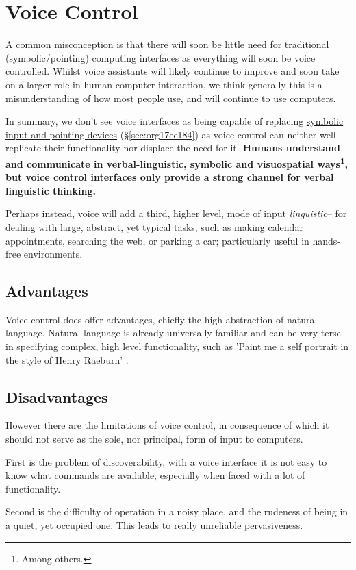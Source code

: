 \documentclass[logo,bsc,singlespacing,parskip]{infthesis}
\begin{document}
\section{Voice Control}
\label{sec:org6fb2dab}
A common misconception is that there will soon be little need for traditional (symbolic/pointing) computing interfaces as everything will soon be voice controlled.
Whilst voice assistants will likely continue to improve and soon take on a larger role in human-computer interaction, we think generally this is a misunderstanding of how most people use, and will continue to use computers.

In summary, we don't see voice interfaces as being capable of replacing \hyperref[sec:org17ee184]{symbolic input and pointing devices} (\S \ref{sec:org17ee184}) as voice control can neither well replicate their functionality nor displace the need for it.
\textbf{Humans understand and communicate in verbal-linguistic, symbolic and visuospatial ways\footnote{Among others.}, but voice control interfaces only provide a strong channel for verbal linguistic thinking.}

Perhaps instead, voice will add a third, higher level, mode of input \emph{linguistic}-- for dealing with large, abstract, yet typical tasks, such as making calendar appointments, searching the web, or parking a car; particularly useful in hands-free environments.

\subsection{Advantages}
\label{sec:org9d6cc31}
Voice control does offer advantages, chiefly the high abstraction of natural language.
Natural language is already universally familiar and can be very terse in specifying complex, high level functionality, such as 'Paint me a self portrait in the style of Henry Raeburn' \autocite{DALL}.

\subsection{Disadvantages}
\label{sec:org90fede6}
However there are the limitations of voice control, in consequence of which it should not serve as the sole, nor principal, form of input to computers.

First is the problem of discoverability, with a voice interface it is not easy to know what commands are available, especially when faced with a lot of functionality.

Second is the difficulty of operation in a noisy place, and the rudeness of being in a quiet, yet occupied one.
This leads to really unreliable \hyperref[pervasiveness]{pervasiveness}.
\end{document}

